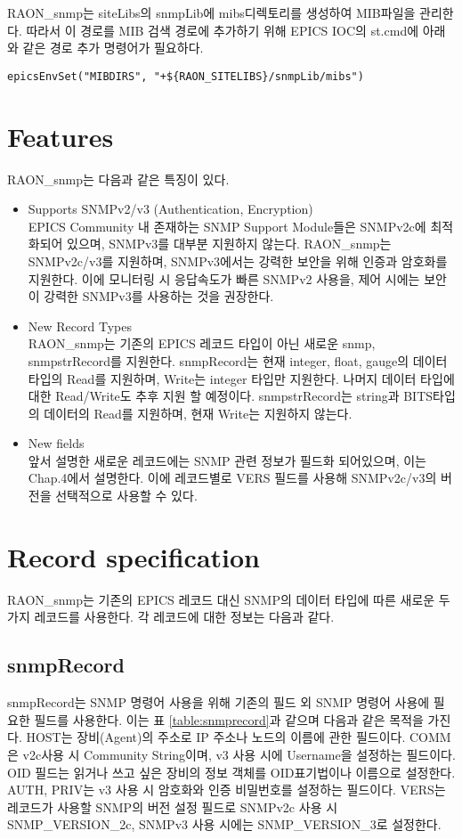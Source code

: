 \documentclass[11pt
  , a4paper
  , article
  , oneside
]{memoir}
\begin{document}
RAON\_snmp는 siteLibs의 snmpLib에 mibs디렉토리를 생성하여 MIB파일을 관리한다. 따라서 이 경로를 MIB 검색 경로에 추가하기 위해 EPICS IOC의 st.cmd에 아래와 같은 경로 추가 명령어가 필요하다.  
{\scriptsize
\begin{verbatim}
epicsEnvSet("MIBDIRS", "+${RAON_SITELIBS}/snmpLib/mibs")
\end{verbatim}
}

\chapter{Features}
RAON\_snmp는 다음과 같은 특징이 있다. 

\begin{itemize}
\item Supports SNMPv2/v3 (Authentication, Encryption) \\
EPICS Community 내 존재하는 SNMP Support Module들은 SNMPv2c에 최적화되어 있으며, SNMPv3를 대부분 지원하지 않는다. RAON\_snmp는 SNMPv2c/v3를 지원하며, SNMPv3에서는 강력한 보안을 위해 인증과 암호화를 지원한다. 이에 모니터링 시 응답속도가 빠른 SNMPv2 사용을, 제어 시에는 보안이 강력한 SNMPv3를 사용하는 것을 권장한다.

\item New Record Types \\
RAON\_snmp는 기존의 EPICS 레코드 타입이 아닌 새로운 snmp, snmpstrRecord를 지원한다. snmpRecord는 현재 integer, float, gauge의 데이터 타입의 Read를 지원하며, Write는 integer 타입만 지원한다. 나머지 데이터 타입에 대한 Read/Write도 추후 지원 할 예정이다. snmpstrRecord는 string과 BITS타입의 데이터의 Read를 지원하며, 현재 Write는 지원하지 않는다.

\item New fields \\
앞서 설명한 새로운 레코드에는 SNMP 관련 정보가 필드화 되어있으며, 이는 Chap.4에서 설명한다. 이에 레코드별로 VERS 필드를 사용해 SNMPv2c/v3의 버전을 선택적으로 사용할 수 있다. 
\end{itemize}

\chapter{Record specification}
RAON\_snmp는 기존의 EPICS 레코드 대신 SNMP의 데이터 타입에 따른 새로운 두 가지 레코드를 사용한다.
각 레코드에 대한 정보는 다음과 같다.

\section{snmpRecord}
snmpRecord는 SNMP 명령어 사용을 위해 기존의 필드 외 SNMP 명령어 사용에 필요한 필드를 사용한다. 이는 표 \ref{table:snmprecord}과 같으며 다음과 같은 목적을 가진다. HOST는 장비(Agent)의 주소로 IP 주소나 노드의 이름에 관한 필드이다. COMM은 v2c사용 시 Community String이며, v3 사용 시에 Username을 설정하는 필드이다. OID 필드는 읽거나 쓰고 싶은 장비의 정보 객체를 OID표기법이나 이름으로 설정한다. AUTH, PRIV는 v3 사용 시 암호화와 인증 비밀번호를 설정하는 필드이다. VERS는 레코드가 사용할 SNMP의 버전 설정 필드로 SNMPv2c 사용 시 SNMP\_VERSION\_2c, SNMPv3 사용 시에는 SNMP\_VERSION\_3로 설정한다. 
\clearpage
\end{document}
